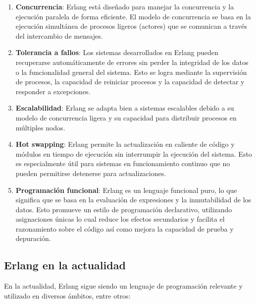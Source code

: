 \begin{enumerate}
    \item \textbf{Concurrencia}: Erlang está diseñado para manejar la concurrencia y la ejecución paralela de forma eficiente. El modelo de concurrencia se basa en la ejecución simultánea de procesos ligeros (actores) que se comunican a través del intercambio de mensajes.
    \item \textbf{Tolerancia a fallos}: Los sistemas desarrollados en Erlang pueden recuperarse automáticamente de errores sin perder la integridad de los datos o la funcionalidad general del sistema. Esto se logra mediante la supervisión de procesos, la capacidad de reiniciar procesos y la capacidad de detectar y responder a excepciones.
    \item \textbf{Escalabilidad}: Erlang se adapta bien a sistemas escalables debido a su modelo de concurrencia ligera y su capacidad para distribuir procesos en múltiples nodos. 
    \item \textbf{Hot swapping}:  Erlang permite la actualización en caliente de código y módulos en tiempo de ejecución sin interrumpir la ejecución del sistema. Esto es especialmente útil para sistemas en funcionamiento continuo que no pueden permitirse detenerse para actualizaciones.
    \item \textbf{Programación funcional}: Erlang es un lenguaje funcional puro, lo que significa que se basa en la evaluación de expresiones y la inmutabilidad de los datos. Esto promueve un estilo de programación declarativo, utilizando asignaciones únicas lo cual reduce los efectos secundarios y facilita el razonamiento sobre el código así como mejora la capacidad de prueba y depuración.
\end{enumerate}

\subsection{Erlang en la actualidad}

En la actualidad, Erlang sigue siendo un lenguaje de programación relevante y utilizado en diversos ámbitos, entre otros:

